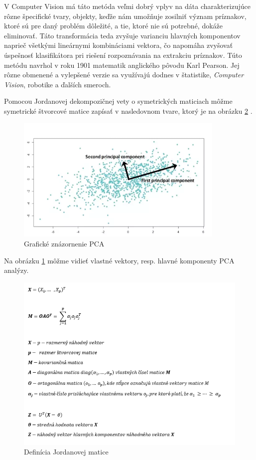 V Computer Vision má táto metóda veľmi dobrý vplyv na dáta charakterizujúce rôzne špecifické tvary, objekty, keďže nám umožňuje zosilniť význam príznakov, ktoré sú pre daný problém dôležité, a tie, ktoré nie sú potrebné, dokáže eliminovať. Táto transformácia teda zvyšuje varianciu hlavných komponentov naprieč všetkými lineárnymi kombináciami vektora, čo napomáha zvyšovať úspešnosť klasifikátora pri riešení rozpoznávania na extrakciu príznakov. Túto metódu navrhol v roku 1901 matematik anglického pôvodu Karl Pearson. Jej rôzne obmenené a vylepšené verzie sa využívajú dodnes v štatistike, \textit{Computer Vision}, robotike a ďalších smeroch.

Pomocou Jordanovej dekompozičnej vety o symetrických maticiach môžme symetrické štvorcové matice zapísať v nasledovnom tvare, ktorý je na obrázku \ref{PCAJord} \cite{c15} \cite{c16}.

\begin{figure}[H]
  \centering
  \includegraphics[width=10cm]{img/PCA.png}
  \caption{Grafické znázornenie PCA \cite{c19}}
  \label{PCA}
\end{figure}
Na obrázku \ref{PCA} môžme vidieť vlastné vektory, resp. hlavné komponenty PCA analýzy.

\begin{figure}[H]
  \centering
  \includegraphics[width=16cm]{img/PCAjordan.png}
  \caption{Definícia Jordanovej matice}
  \label{PCAJord}
\end{figure}

